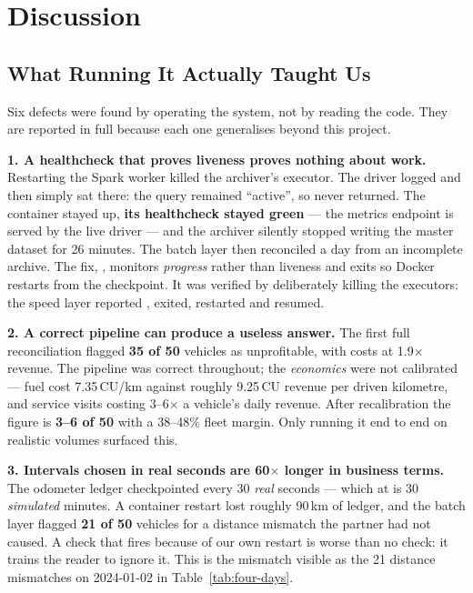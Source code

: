 \chapter{Discussion}
\label{ch:discussion}

\section{What Running It Actually Taught Us}
\label{sec:defects}

Six defects were found by operating the system, not by reading the code.
They are reported in full because each one generalises beyond this
project.

\textbf{1. A healthcheck that proves liveness proves nothing about
work.} Restarting the Spark worker killed the archiver's executor. The
driver logged  and then simply sat
there: the query remained ``active'', so  never
returned. The container stayed up, \textbf{its healthcheck stayed green}
--- the metrics endpoint is served by the live driver --- and the archiver
silently stopped writing the master dataset for 26 minutes. The batch
layer then reconciled a day from an incomplete archive. The fix,
, monitors \emph{progress} rather than
liveness and exits so Docker restarts from the checkpoint. It was
verified by deliberately killing the executors: the speed layer reported
, exited, restarted and
resumed.

\textbf{2. A correct pipeline can produce a useless answer.} The first
full reconciliation flagged \textbf{35 of 50} vehicles as unprofitable,
with costs at 1.9$\times$ revenue. The pipeline was correct throughout;
the \emph{economics} were not calibrated --- fuel cost 7.35\,CU/km against
roughly 9.25\,CU revenue per driven kilometre, and service visits costing
3--6$\times$ a vehicle's daily revenue. After recalibration the figure is
\textbf{3--6 of 50} with a 38--48\% fleet margin. Only running it end to
end on realistic volumes surfaced this.

\textbf{3. Intervals chosen in real seconds are 60$\times$ longer in
business terms.} The odometer ledger checkpointed every 30 \emph{real}
seconds --- which at  is 30 \emph{simulated}
minutes. A container restart lost roughly 90\,km of ledger, and the batch
layer flagged \textbf{21 of 50} vehicles for a distance mismatch the
partner had not caused. A check that fires because of our own restart is
worse than no check: it trains the reader to ignore it. This is the
mismatch visible as the 21 distance mismatches on 2024-01-02 in
Table~\ref{tab:four-days}.

